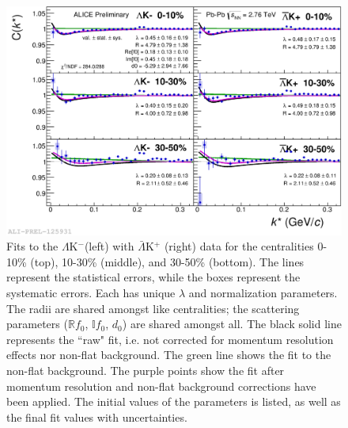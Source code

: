\documentclass[../AnalysisNoteJBuxton.tex]{subfiles}
\begin{document}
\begin{figure}[h]
  \centering
  \includegraphics[width=\textwidth]{7_ResultsAndDiscussion/Figures/2017-Feb-03-canKStarCfwFitsLamKchMwConj_0010_1030_3050_MomResCrctn_NonFlatBgdCrctn.png}
  \caption[$\Lambda$K$^{-}$($\bar{\Lambda}$K$^{+}$) Fits]{Fits to the $\Lambda$K$^{-}$(left) with $\bar{\Lambda}$K$^{+}$ (right) data for the centralities 0-10\% (top), 10-30\% (middle), and 30-50\% (bottom).
The lines represent the statistical errors, while the boxes represent the systematic errors.  
Each has unique $\lambda$ and normalization parameters.
The radii are shared amongst like centralities; the scattering parameters ($\mathbb{R}f_{0}$, $\mathbb{I}f_{0}$, $d_{0}$) are shared amongst all.
The black solid line represents the ``raw" fit, i.e. not corrected for momentum resolution effects nor non-flat background.  
The green line shows the fit to the non-flat background.
The purple points show the fit after momentum resolution and non-flat background corrections have been applied.
The initial values of the parameters is listed, as well as the final fit values with uncertainties.}
  \label{fig:LamKchMwConjFits}
\end{figure}
\end{document}
